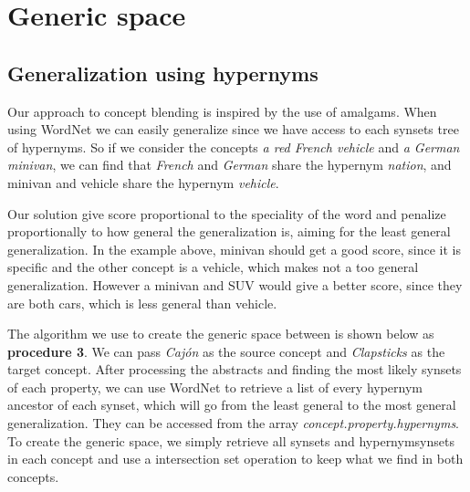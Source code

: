 
\section{Generic space}
\subsection{Generalization using hypernyms}
Our approach to concept blending is inspired by the use of amalgams. When using WordNet we can easily generalize since we have access to each synsets tree of hypernyms. So if we consider the concepts \emph{a red French vehicle} and \emph{a German minivan}, we can find that \emph{French} and \emph{German} share the hypernym \emph{nation}, and minivan and vehicle share the hypernym \emph{vehicle}.

Our solution give score proportional to the speciality of the word and penalize proportionally to how general the generalization is, aiming for the least general generalization. In the example above, minivan should get a good score, since it is specific and the other concept is a vehicle, which makes not a too general generalization. However a minivan and SUV would give a better score, since they are both cars, which is less general than vehicle.

The algorithm we use to create the generic space between is shown below as \textbf{procedure 3}. We can pass \emph{Cajón} as the source concept and \emph{Clapsticks} as the target concept. After processing the abstracts and finding the most likely synsets of each property, we can use WordNet to retrieve a list of every hypernym ancestor of each synset, which will go from the least general to the most general generalization. They can be accessed from the array \emph{concept.property.hypernyms}. To create the generic space, we simply retrieve all synsets and hypernymsynsets in each concept and use a intersection set operation to keep what we find in both concepts.

